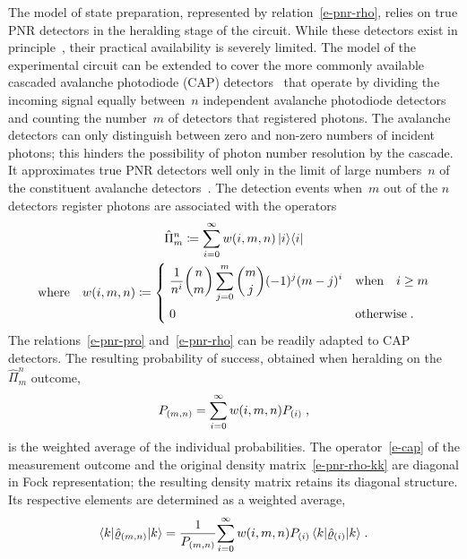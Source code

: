 \documentclass{article}
\begin{document}
The model of state preparation, represented by relation~\eqref{e-pnr-rho}, relies on true PNR detectors in the heralding stage of the circuit. While these detectors exist in principle~\cite{hopker2019,endo2021,endo2024}, their practical availability is severely limited. The model of the experimental circuit can be extended to cover the more commonly available cascaded avalanche photodiode (CAP) detectors~\cite{hlousek2019,grygar2022,hlousek2024,ercolano2024} that operate by dividing the incoming signal equally between~$n$ independent avalanche photodiode detectors and counting the number~$m$ of detectors that registered photons. The avalanche detectors can only distinguish between zero and non-zero numbers of incident photons; this hinders the possibility of photon number resolution by the cascade. It approximates true PNR detectors well only in the limit of large numbers~$n$ of the constituent avalanche detectors~\cite{provaznik2020}. The detection events when~$m$ out of the $n$ detectors register photons are associated with the operators~\cite{paul1996}
%
\begin{equation}\label{e-cap}
  \begin{gathered}
  \hat{\Pi}_{m}^{n} 
    \coloneqq \sum_{i = 0}^{\infty} w(i, m, n) \ketbra{i}{i} \\
  \text{where} \quad
  w(i, m, n) 
    \coloneqq 
    \begin{dcases}
      \; \frac{1}{n^{i}} \binom{n}{m} \sum_{j = 0}^{m} \binom{m}{j} (-1)^{j} (m - j)^{i} 
      & \text{when}\quad i \geq m \\
      \; 0 & \text{otherwise} \Qd
    \end{dcases}
  \end{gathered}
\end{equation} 
%
The relations~\eqref{e-pnr-pro} and~\eqref{e-pnr-rho} can be readily adapted to CAP detectors. The resulting probability of success, obtained when heralding on the~$\hat{\Pi}_{m}^{n}$ outcome, 
%
\begin{equation}\label{e-cap-pro}
  P_{(m, n)} = \sum_{i = 0}^{\infty} w(i, m, n) P_{(i)} \;\text{,}
\end{equation}
%
is the weighted average of the individual probabilities. The operator~\eqref{e-cap} of the measurement outcome and the original density matrix~\eqref{e-pnr-rho-kk} are diagonal in Fock representation; the resulting density matrix retains its diagonal structure. Its respective elements are determined as a weighted average,
%
\begin{equation}\label{e-cap-rho-kk}
  \braket{k|\hat{\varrho}_{(m, n)}|k} =
    \frac{1}{ P_{(m,n)} }
    { \sum_{i = 0}^{\infty} w(i, m, n) P_{(i)} \braket{k|\hat{\varrho}_{(i)}|k} }
  \;\text{.}
\end{equation}
\end{document}
